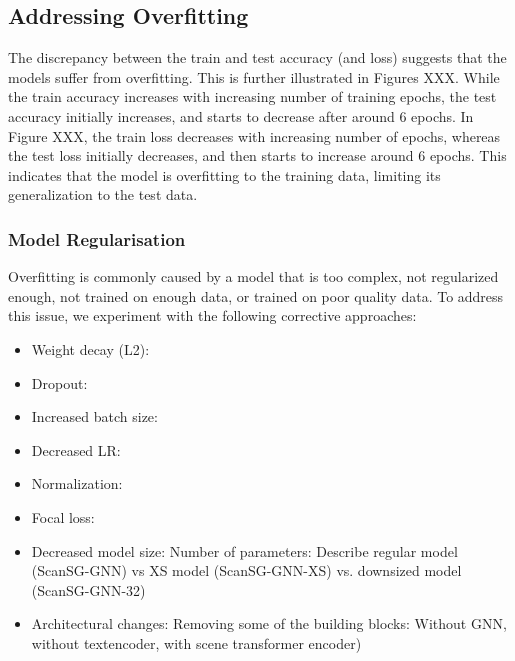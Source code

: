 \subsection{Addressing Overfitting}
The discrepancy between the train and test accuracy (and loss) suggests that the models suffer from overfitting. This is further illustrated in Figures XXX. While the train accuracy increases with increasing number of training epochs, the test accuracy initially increases, and starts to decrease after around 6 epochs. In Figure XXX, the train loss decreases with increasing number of epochs, whereas the test loss initially decreases, and then starts to increase around 6 epochs. This indicates that the model is overfitting to the training data, limiting its generalization to the test data.



\subsubsection{Model Regularisation}
Overfitting is commonly caused by a model that is too complex, not regularized enough, not trained on enough data, or trained on poor quality data. To address this issue, we experiment with the following corrective approaches:
\begin{itemize}
    \item Weight decay (L2):
    \item Dropout:
    \item Increased batch size:
    \item Decreased LR:
    \item Normalization:
    \item Focal loss:
    \item Decreased model size: Number of parameters: Describe regular model (ScanSG-GNN) vs XS model (ScanSG-GNN-XS) vs. downsized model (ScanSG-GNN-32)
    \item Architectural changes: Removing some of the building blocks: Without GNN, without textencoder, with scene transformer encoder)
\end{itemize}

